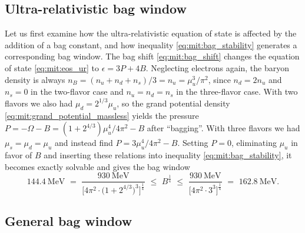 \subsection*{Ultra-relativistic bag window}

Let us first examine how the ultra-relativistic equation of state is affected by the addition of a bag constant,
and how inequality \eqref{eq:mit:bag_stability} generates a corresponding bag window.
The bag shift \eqref{eq:mit:bag_shift} changes the equation of state \eqref{eq:mit:eos_ur} to $\epsilon = 3 P + 4 B$.
Neglecting electrons again, the baryon density is always $n_B = (n_u+n_d+n_s)/3 = n_u = \mu_u^3 / \pi^2$,
since $n_d = 2 n_u$ and $n_s=0$ in the two-flavor case and $n_u=n_d=n_s$ in the three-flavor case.
With two flavors we also had $\mu_d = 2^{1/3} \mu_u$,
so the grand potential density \eqref{eq:mit:grand_potential_massless}
yields the pressure $P = -\Omega - B = (1 + 2^{4/3}) \mu_u^4 / 4 \pi^2 - B$ after ``bagging''.
With three flavors we had $\mu_s = \mu_d = \mu_u$ and instead find $P = 3 \mu_u^4 / 4 \pi^2 - B$.
Setting $P=0$, eliminating $\mu_u$ in favor of $B$ and inserting these relations into inequality \eqref{eq:mit:bag_stability},
it becomes exactly solvable and gives the bag window
\begin{equation}
	\SI{144.4}{\mega\electronvolt} \,\, = \,\,
	\frac{\SI{930}{\mega\electronvolt}}{\Big[4 \pi^2 \!\cdot\! \big(1+2^{4/3}\big)^3\Big]^\frac14}
	\,\, \leq \,\, B^\frac14 \,\, \leq \,\,
	\frac{\SI{930}{\mega\electronvolt}}{\Big[4 \pi^2 \!\cdot\! 3^3\Big]^\frac14}
	\,\, = \,\, \SI{162.8}{\mega\electronvolt}.
\label{eq:mit:bag_window_ur}
\end{equation}

\subsection*{General bag window}

